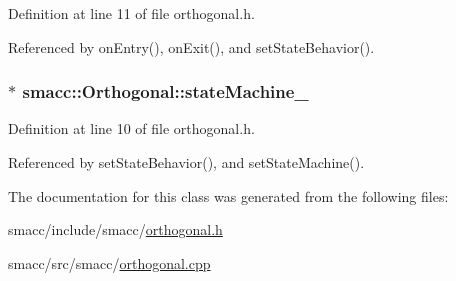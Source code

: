 Definition at line 11 of file orthogonal.\+h.



Referenced by on\+Entry(), on\+Exit(), and set\+State\+Behavior().

\subsubsection[{\texorpdfstring{state\+Machine\+\_\+}{stateMachine_}}]{$\ast$ smacc\+::\+Orthogonal\+::state\+Machine\+\_\+}\hypertarget{classsmacc_1_1Orthogonal_acea2058ac94667e46fc60ed3d4f524f7}{}\label{classsmacc_1_1Orthogonal_acea2058ac94667e46fc60ed3d4f524f7}


Definition at line 10 of file orthogonal.\+h.



Referenced by set\+State\+Behavior(), and set\+State\+Machine().



The documentation for this class was generated from the following files\+:\begin{DoxyCompactItemize}
\item 
smacc/include/smacc/\hyperlink{orthogonal_8h}{orthogonal.\+h}\item 
smacc/src/smacc/\hyperlink{orthogonal_8cpp}{orthogonal.\+cpp}\end{DoxyCompactItemize}
